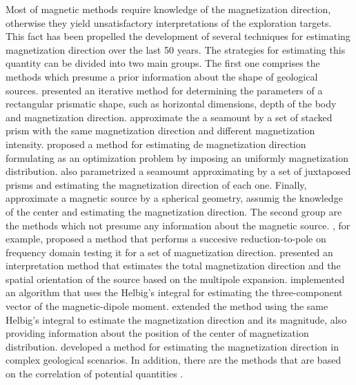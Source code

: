 Most of  magnetic methods require knowledge of the magnetization direction, otherwise they yield unsatisfactory interpretations of the exploration targets. This fact has been propelled the development of several techniques for estimating magnetization direction over the last 50 years. The strategies for estimating this quantity can be divided into two main groups. The first one comprises the methods which presume a prior information about the shape of geological sources. \cite{bhattacharyya1966} presented an iterative method for determining the parameters of a rectangular prismatic shape, such as horizontal dimensions, depth of the body and magnetization direction. \cite{emilia_massey_1974} approximate the a seamount by a set of stacked prism with the same magnetization direction and different magnetization intensity. \cite{parker_etal_1987} proposed a method for estimating de magnetization direction formulating as an optimization problem by imposing an uniformly magnetization distribution. \cite{kubota2005} also parametrized a seamoumt approximating by a set of juxtaposed prisms and estimating the magnetization direction of each one. Finally, \cite{oliveirajr_etal_2015} approximate a magnetic source by a spherical geometry, assumig the knowledge of the center and estimating the magnetization direction. The second group are the methods which not presume any information about the magnetic source. \cite{fedi_etal_1994}, for example, proposed a method that performs a succesive reduction-to-pole on frequency domain testing it for a set of magnetization direction. \cite{medeiros_silva_1995} presented an interpretation method that estimates the total magnetization direction and the spatial orientation of the source based on the multipole expansion. \cite{phillips2005} implemented an algorithm that uses the Helbig's integral for estimating the three-component vector of the magnetic-dipole moment. \cite{tontini_pedersen_2008} extended the method using the same Helbig's integral to estimate the magnetization direction and its magnitude, also providing information about the position of the center of magnetization distribution. \cite{lelievre_oldenburg_2009} developed a method for estimating the magnetization direction in complex geological scenarios. In addition, there are the methods that are based on the correlation of potential quantities \citep[e.g.,][]{dannemiller_li_2006,gerovska_etal_2009,liu_etal_2015,zhang_etal_2018}.

